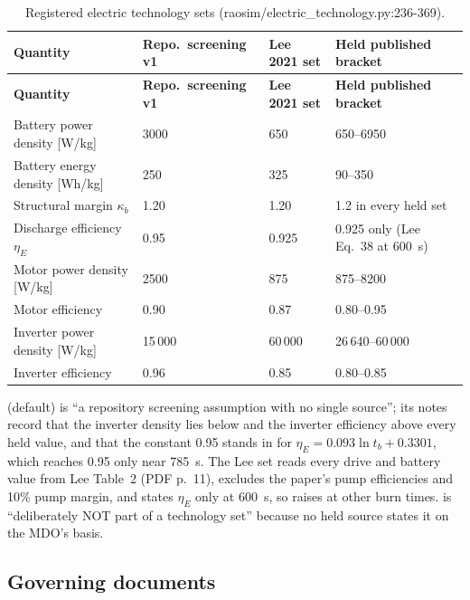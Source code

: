 {\small
\begin{longtable}{@{}P{5.0cm}P{2.4cm}P{2.4cm}P{6.0cm}@{}}
\caption{Registered electric technology sets (raosim/electric\_technology.py:236-369).}\label{tab:s09-tech}\\
\toprule
\textbf{Quantity} & \textbf{Repo.\ screening v1} & \textbf{Lee 2021 set} & \textbf{Held published bracket} \\
\midrule
\endfirsthead
\toprule
\textbf{Quantity} & \textbf{Repo.\ screening v1} & \textbf{Lee 2021 set} & \textbf{Held published bracket} \\
\midrule
\endhead
Battery power density [W/kg] & 3000 & 650 & 650--6950 \\
Battery energy density [Wh/kg] & 250 & 325 & 90--350 \\
Structural margin $\kappa_b$ & 1.20 & 1.20 & 1.2 in every held set \\
Discharge efficiency $\eta_E$ & 0.95 & 0.925 & 0.925 only (Lee Eq.~38 at 600~s) \\
Motor power density [W/kg] & 2500 & 875 & 875--8200 \\
Motor efficiency & 0.90 & 0.87 & 0.80--0.95 \\
Inverter power density [W/kg] & 15\,000 & 60\,000 & 26\,640--60\,000 \\
Inverter efficiency & 0.96 & 0.85 & 0.80--0.85 \\
\bottomrule
\end{longtable}}

 (default) is ``a repository screening assumption
with no single source''; its notes record that the inverter density lies below and
the inverter efficiency above every held value, and that the constant 0.95 stands
in for $\eta_E=0.093\ln t_b+0.3301$, which reaches 0.95 only near 785~s. The Lee
set reads every drive and battery value from Lee Table~2 (PDF p.~11), excludes the
paper's pump efficiencies and 10\% pump margin, and states $\eta_E$ only at 600~s,
so  raises  at other burn
times.  is ``deliberately NOT part of a
technology set'' because no held source states it on the MDO's basis.

\subsection{Governing documents}

